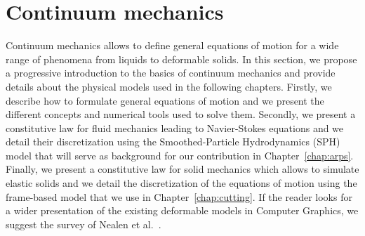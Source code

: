 \section{Continuum mechanics}

Continuum mechanics allows to define general equations of motion for a wide range of phenomena from liquids to deformable solids. 
In this section, we propose a progressive introduction to the basics of continuum mechanics and provide details about the physical models used in the following chapters. 
Firstly, we describe how to formulate general equations of motion and we present the different concepts and numerical tools used to solve them.
Secondly, we present a constitutive law for fluid mechanics leading to Navier-Stokes equations and we detail their discretization using the Smoothed-Particle Hydrodynamics (SPH) model that will serve as background for our contribution in Chapter~\ref{chap:arps}.
Finally, we present a constitutive law for solid mechanics which allows to simulate elastic solids and we detail the discretization of the equations of motion using the frame-based model that we use in Chapter~\ref{chap:cutting}.
If the reader looks for a wider presentation of the existing deformable models in Computer Graphics, we suggest the survey of Nealen et al.~\cite{Nealen2006}.
%

